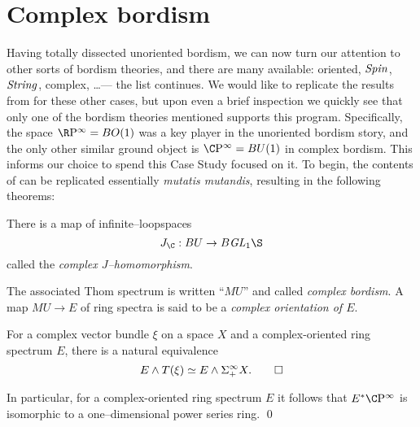 
\chapter{Complex bordism}\label{ComplexBordismChapter}


Having totally dissected unoriented bordism, we can now turn our attention to other sorts of bordism theories, and there are many available: oriented, $\mathit{Spin}$, $\mathit{String}$, complex, \ldots --- the list continues.  We would like to replicate the results from  for these other cases, but upon even a brief inspection we quickly see that only one of the bordism theories mentioned supports this program.  Specifically, the space $\RP^\infty = BO(1)$ was a key player in the unoriented bordism story, and the only other similar ground object is $\CP^\infty = BU(1)$ in complex bordism.  This informs our choice to spend this Case Study focused on it.  To begin, the contents of  can be replicated essentially \textit{mutatis mutandis}, resulting in the following theorems:

\begin{theorem}
There is a map of infinite--loopspaces \[J_{\C}: BU \to B \GL_1 \S \] called the \textit{complex $J$--homomorphism}.
\end{theorem}

\begin{definition}
The associated Thom spectrum is written ``$MU$'' and called \textit{complex bordism}.  A map $MU \to E$ of ring spectra is said to be a \textit{complex orientation of $E$}.
\end{definition}

\begin{theorem}\label{ThomIsomOverC}
For a complex vector bundle $\xi$ on a space $X$ and a complex-oriented ring spectrum $E$, there is a natural equivalence \[E \wedge T(\xi) \simeq E \wedge \Sigma^\infty_+ X. \qed\]
\end{theorem}

\begin{corollary}\label{CPinftyNiceCalculation}
In particular, for a complex-oriented ring spectrum $E$ it follows that $E^* \CP^\infty$ is isomorphic to a one--dimensional power series ring. \qed
{}
\end{corollary}

